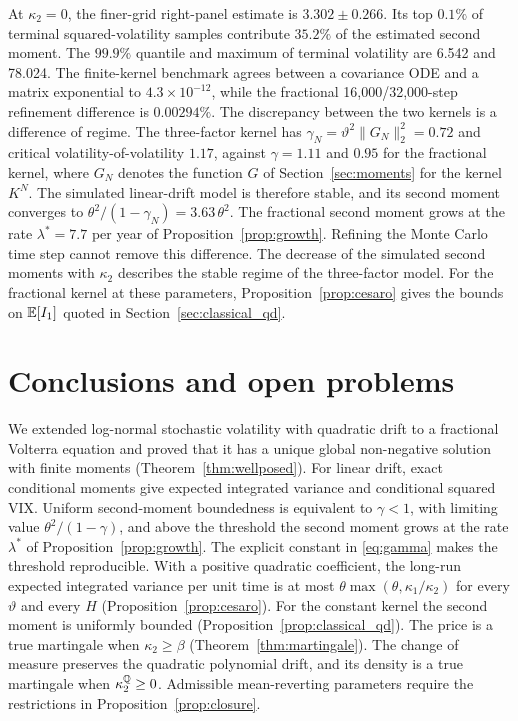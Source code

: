 At $\kappa_2=0$, the finer-grid right-panel estimate is $3.302\pm0.266$. Its top $0.1\%$ of terminal squared-volatility samples contribute $35.2\%$ of the estimated second moment. The $99.9\%$ quantile and maximum of terminal volatility are 6.542 and 78.024. The finite-kernel benchmark agrees between a covariance ODE and a matrix exponential to $4.3\times10^{-12}$, while the fractional 16,000/32,000-step refinement difference is $0.00294\%$. The discrepancy between the two kernels is a difference of regime. The three-factor kernel has $\gamma_N=\vartheta^2\|G_N\|_2^2=0.72$ and critical volatility-of-volatility $1.17$, against $\gamma=1.11$ and $0.95$ for the fractional kernel, where $G_N$ denotes the function $G$ of Section~\ref{sec:moments} for the kernel $K^N$. The simulated linear-drift model is therefore stable, and its second moment converges to $\theta^2/(1-\gamma_N)=3.63\,\theta^2$. The fractional second moment grows at the rate $\lambda^*=7.7$ per year of Proposition~\ref{prop:growth}. Refining the Monte Carlo time step cannot remove this difference. The decrease of the simulated second moments with $\kappa_2$ describes the stable regime of the three-factor model. For the fractional kernel at these parameters, Proposition~\ref{prop:cesaro} gives the bounds on $\mathbb{E}[I_1]$ quoted in Section~\ref{sec:classical_qd}.


\section{Conclusions and open problems}\label{sec:conclusion}

We extended log-normal stochastic volatility with quadratic drift to a fractional Volterra equation and proved that it has a unique global non-negative solution with finite moments (Theorem~\ref{thm:wellposed}). For linear drift, exact conditional moments give expected integrated variance and conditional squared VIX. Uniform second-moment boundedness is equivalent to $\gamma<1$, with limiting value $\theta^2/(1-\gamma)$, and above the threshold the second moment grows at the rate $\lambda^*$ of Proposition~\ref{prop:growth}. The explicit constant in \eqref{eq:gamma} makes the threshold reproducible. With a positive quadratic coefficient, the long-run expected integrated variance per unit time is at most $\theta\max(\theta,\kappa_1/\kappa_2)$ for every $\vartheta$ and every $H$ (Proposition~\ref{prop:cesaro}). For the constant kernel the second moment is uniformly bounded (Proposition~\ref{prop:classical_qd}). The price is a true martingale when $\kappa_2\ge\beta$ (Theorem~\ref{thm:martingale}). The change of measure preserves the quadratic polynomial drift, and its density is a true martingale when $\kappa_2^{\mathbb{Q}}\ge0$. Admissible mean-reverting parameters require the restrictions in Proposition~\ref{prop:closure}.

